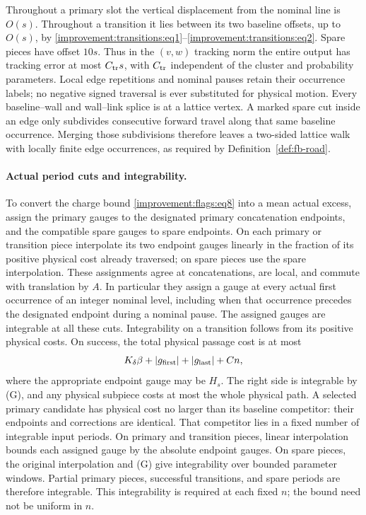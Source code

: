 Throughout a primary slot the vertical displacement from the nominal
line is $O(s)$. Throughout a transition it lies between its two baseline
offsets, up to $O(s)$, by
\eqref{improvement:transitions:eq1}--\eqref{improvement:transitions:eq2}.
Spare pieces have offset $10s$. Thus in the $(v,w)$ tracking norm the
entire output has tracking error at most $C_{\rm tr}s$, with
$C_{\rm tr}$ independent of the cluster and probability parameters.
Local edge repetitions and nominal pauses retain their occurrence
labels; no negative signed traversal is ever substituted for physical
motion.
Every baseline--wall and wall--link splice is at a lattice vertex.
A marked spare cut inside an edge only subdivides consecutive forward
travel along that same baseline occurrence. Merging those subdivisions
therefore leaves a two-sided lattice walk with locally finite edge
occurrences, as required by Definition~\ref{def:fb-road}.

\paragraph{Actual period cuts and integrability.}
To convert the charge bound \eqref{improvement:flags:eq8} into a mean
actual excess, assign the primary gauges to the designated primary
concatenation endpoints, and the compatible spare gauges to spare
endpoints. On each primary or transition piece interpolate its two
endpoint gauges linearly in the fraction of its positive physical
cost already traversed; on spare pieces use the spare interpolation.
These assignments agree at concatenations, are local, and commute
with translation by $A$. In particular they assign a gauge at every
actual first occurrence of an integer nominal level, including when
that occurrence precedes the designated endpoint during a nominal
pause. The assigned gauges are integrable at all these cuts.
Integrability on a transition follows from its positive physical
costs. On success, the total physical passage cost is at most
\[
 K_\delta\beta+|g_{\rm first}|+|g_{\rm last}|+C n,
\]
where the appropriate endpoint gauge may be $H_s$. The right side is
integrable by (G), and any physical subpiece costs at most the whole
physical path. A selected primary candidate has physical cost no
larger than its baseline competitor: their endpoints and corrections
are identical. That competitor lies in a fixed number of integrable
input periods. On primary and transition pieces, linear interpolation
bounds each assigned gauge by the absolute endpoint gauges. On spare
pieces, the original interpolation and (G) give integrability over
bounded parameter windows. Partial primary pieces, successful
transitions, and spare periods are therefore integrable.
This integrability is required at each fixed $n$; the bound need not be
uniform in $n$.

